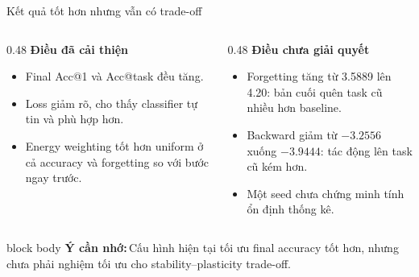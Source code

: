 \documentclass[aspectratio=169,10pt]{beamer}
\newcommand{\remember}[1]{%
  \par\vspace{0.12cm}%
  \begin{beamercolorbox}[wd=\linewidth,sep=0.11cm,leftskip=0.08cm,rightskip=0.08cm,rounded=true]{block body}
    \footnotesize\textbf{\color{HRMBlue}Ý cần nhớ:}\,\color{HRMDark}#1
  \end{beamercolorbox}
}
\begin{document}
\begin{frame}{Kết quả tốt hơn nhưng vẫn có trade-off}
  \begin{columns}[T,onlytextwidth]
    \begin{column}{0.48\textwidth}
      {\large\bfseries Điều đã cải thiện}\par\vspace{0.25cm}
      \begin{itemize}\setlength\itemsep{0.3cm}
        \item Final Acc@1 và Acc@task đều tăng.
        \item Loss giảm rõ, cho thấy classifier tự tin và phù hợp hơn.
        \item Energy weighting tốt hơn uniform ở cả accuracy và forgetting so với bước ngay trước.
      \end{itemize}
    \end{column}
    \begin{column}{0.48\textwidth}
      {\large\bfseries Điều chưa giải quyết}\par\vspace{0.25cm}
      \begin{itemize}\setlength\itemsep{0.3cm}
        \item Forgetting tăng từ 3.5889 lên 4.20: bản cuối quên task cũ nhiều hơn baseline.
        \item Backward giảm từ $-3.2556$ xuống $-3.9444$: tác động lên task cũ kém hơn.
        \item Một seed chưa chứng minh tính ổn định thống kê.
      \end{itemize}
    \end{column}
  \end{columns}
  \remember{Cấu hình hiện tại tối ưu final accuracy tốt hơn, nhưng chưa phải nghiệm tối ưu cho stability--plasticity trade-off.}
\end{frame}
\end{document}
